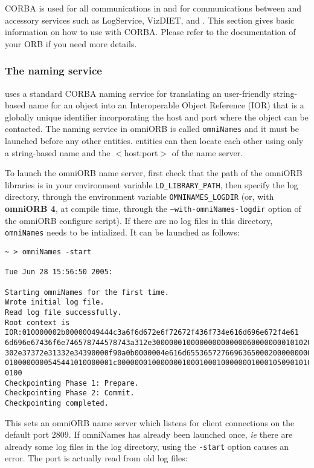 CORBA is used for all communications in \diet and for communications between
\diet and accessory services such as LogService, VizDIET, and \godiet.  This
section gives basic information on how to use \diet with CORBA.  Please refer
to the documentation of your ORB if you need more details.

\subsubsection{The naming service}

\diet uses a standard CORBA naming service for translating an user-friendly
string-based name for an object into an Interoperable Object Reference (IOR)
that is a globally unique identifier incorporating the host and port where the
object can be contacted.  The naming service in omniORB is called
\texttt{omniNames} and it must be launched before any other \diet entities.
\diet entities can then locate each other using only a string-based name and
the $<$host:port$>$ of the name server.

To launch the omniORB name server, first check that the path of the omniORB
libraries is in your environment variable \texttt{LD\_LIBRARY\_PATH}, then
specify the log directory, through the environment variable
\texttt{OMNINAMES\_LOGDIR} (or, with \textbf{omniORB 4}, at compile time,
through the \texttt{--with-omniNames-logdir} option of the omniORB configure
script). If there are no log files in this directory, \texttt{omniNames} needs
to be intialized. It can be launched as follows:

{\footnotesize
\begin{verbatim}
~ > omniNames -start

Tue Jun 28 15:56:50 2005:

Starting omniNames for the first time.
Wrote initial log file.
Read log file successfully.
Root context is IOR:010000002b00000049444c3a6f6d672e6f72672f436f734e616d696e672f4e61
6d696e67436f6e746578744578743a312e300000010000000000000060000000010102000d0000003134
302e37372e31332e34390000f90a0b0000004e616d655365727669636500020000000000000008000000
0100000000545441010000001c0000000100000001000100010000000100010509010100010000000901
0100
Checkpointing Phase 1: Prepare.
Checkpointing Phase 2: Commit.
Checkpointing completed.
\end{verbatim}
}

This sets an omniORB name server which listens for client connections on the
default port 2809. If omniNames has already been launched once, \emph{ie} there
are already some log files in the log directory, using the \texttt{-start}
option causes an error. The port is actually read from old log files:


